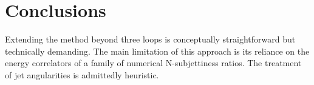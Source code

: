 \section{Conclusions}\label{sec:conclusions}

Extending the method beyond three loops is conceptually straightforward
but technically demanding. The main limitation of this approach is its
reliance on the energy correlators of a family of numerical
N-subjettiness ratios. The treatment of jet angularities is admittedly
heuristic.

